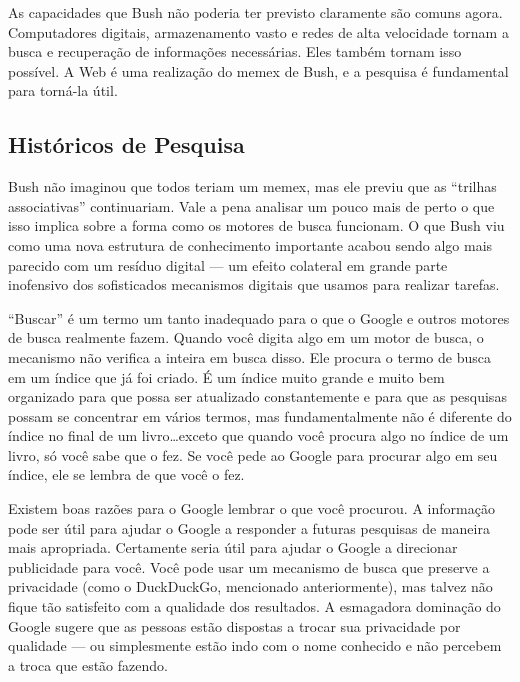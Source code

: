 As capacidades que Bush não poderia ter previsto claramente são comuns agora. Computadores
digitais, armazenamento vasto e redes de alta velocidade tornam a busca e recuperação de
informações necessárias. Eles também tornam isso possível. A Web é uma realização do memex de
Bush, e a pesquisa é fundamental para torná-la útil.

\subsection{Históricos de Pesquisa}
\label{gatekeepers:historicos}

Bush não imaginou que todos teriam um memex, mas ele previu que as ``trilhas associativas''
continuariam. Vale a pena analisar um pouco mais de perto o que isso implica sobre a forma como
os motores de busca funcionam. O que Bush viu como uma nova estrutura de conhecimento importante
acabou sendo algo mais parecido com um resíduo digital --- um efeito colateral em grande parte
inofensivo dos sofisticados mecanismos digitais que usamos para realizar tarefas.

``Buscar'' é um termo um tanto inadequado para o que o Google e outros motores de busca
realmente fazem. Quando você digita algo em um motor de busca, o mecanismo não verifica a
 inteira em busca disso. Ele procura o termo de busca em um índice que
já foi criado. É um índice muito grande e muito bem organizado para que possa ser atualizado
constantemente e para que as pesquisas possam se concentrar em vários termos, mas fundamentalmente
não é diferente do índice no final de um livro\ldots exceto que quando você procura algo no
índice de um livro, só você sabe que o fez. Se você pede ao Google para procurar algo em seu
índice, ele se lembra de que você o fez.

Existem boas razões para o Google lembrar o que você procurou. A informação pode ser útil para
ajudar o Google a responder a futuras pesquisas de maneira mais apropriada. Certamente seria útil
para ajudar o Google a direcionar publicidade para você. Você pode usar um mecanismo de busca que
preserve a privacidade (como o DuckDuckGo, mencionado anteriormente), mas talvez não fique tão
satisfeito com a qualidade dos resultados. A esmagadora dominação do Google sugere que as pessoas
estão dispostas a trocar sua privacidade por qualidade --- ou simplesmente estão indo com o nome
conhecido e não percebem a troca que estão fazendo.

